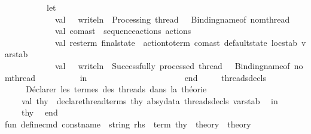 \begin{isabellebody}
\ \ \ \ \ \ \ \ \ \ let\isanewline
\ \ \ \ \ \ \ \ \ \ \ \ val\ {\isacharunderscore}{\kern0pt}\ {\isacharequal}{\kern0pt}\ writeln\ {\isacharparenleft}{\kern0pt}{\isachardoublequote}{\kern0pt}{\isacharequal}{\kern0pt}{\isacharequal}{\kern0pt}\ Processing\ thread\ {\isachardoublequote}{\kern0pt}\ {\isacharcircum}{\kern0pt}\ Binding{\isachardot}{\kern0pt}name{\isacharunderscore}{\kern0pt}of\ nom{\isacharunderscore}{\kern0pt}thread\ {\isacharcircum}{\kern0pt}\ {\isachardoublequote}{\kern0pt}\ {\isacharequal}{\kern0pt}{\isacharequal}{\kern0pt}{\isachardoublequote}{\kern0pt}{\isacharparenright}{\kern0pt}\isanewline
\ \ \ \ \ \ \ \ \ \ \ \ val\ com{\isacharunderscore}{\kern0pt}ast\ {\isacharequal}{\kern0pt}\ sequence{\isacharunderscore}{\kern0pt}actions\ actions\isanewline
\ \ \ \ \ \ \ \ \ \ \ \ val\ {\isacharparenleft}{\kern0pt}res{\isacharunderscore}{\kern0pt}term{\isacharcomma}{\kern0pt}\ final{\isacharunderscore}{\kern0pt}state{\isacharparenright}{\kern0pt}\ {\isacharequal}{\kern0pt}\ action{\isacharunderscore}{\kern0pt}to{\isacharunderscore}{\kern0pt}term\ com{\isacharunderscore}{\kern0pt}ast\ default{\isacharunderscore}{\kern0pt}state\ locstab\ varstab\isanewline
\ \ \ \ \ \ \ \ \ \ \ \ val\ {\isacharunderscore}{\kern0pt}\ {\isacharequal}{\kern0pt}\ writeln\ {\isacharparenleft}{\kern0pt}{\isachardoublequote}{\kern0pt}{\isasymcheckmark}\ Successfully\ processed\ thread\ {\isachardoublequote}{\kern0pt}\ {\isacharcircum}{\kern0pt}\ Binding{\isachardot}{\kern0pt}name{\isacharunderscore}{\kern0pt}of\ nom{\isacharunderscore}{\kern0pt}thread{\isacharparenright}{\kern0pt}\isanewline
\ \ \ \ \ \ \ \ \ \ in\isanewline
\ \ \ \ \ \ \ \ \ \ \ \ {\isacharparenleft}{\kern0pt}{\isacharparenright}{\kern0pt}\isanewline
\ \ \ \ \ \ \ \ \ \ end\isanewline
\ \ \ \ {\isacharparenright}{\kern0pt}\ threads{\isacharunderscore}{\kern0pt}decls\isanewline
\isanewline
\ \ \ \ {\isacharparenleft}{\kern0pt}{\isacharasterisk}{\kern0pt}\ Déclarer\ les\ termes\ des\ threads\ dans\ la\ théorie\ {\isacharasterisk}{\kern0pt}{\isacharparenright}{\kern0pt}\isanewline
\ \ \ \ val\ thy{\isacharprime}{\kern0pt}\ {\isacharequal}{\kern0pt}\ declare{\isacharunderscore}{\kern0pt}thread{\isacharunderscore}{\kern0pt}terms\ thy\ absy{\isacharunderscore}{\kern0pt}data\ threads{\isacharunderscore}{\kern0pt}decls\ varstab\isanewline
\ \ in\isanewline
\ \ \ \ thy{\isacharprime}{\kern0pt}\isanewline
\ \ end\isanewline
\isanewline
fun\ define{\isacharunderscore}{\kern0pt}cmd\ {\isacharparenleft}{\kern0pt}const{\isacharunderscore}{\kern0pt}name\ {\isacharcolon}{\kern0pt}\ string{\isacharparenright}{\kern0pt}\ {\isacharparenleft}{\kern0pt}rhs\ {\isacharcolon}{\kern0pt}\ term{\isacharparenright}{\kern0pt}\ {\isacharparenleft}{\kern0pt}thy\ {\isacharcolon}{\kern0pt}\ theory{\isacharparenright}{\kern0pt}\ {\isacharcolon}{\kern0pt}\ theory\ {\isacharequal}{\kern0pt}\isanewline

\end{isabellebody}
